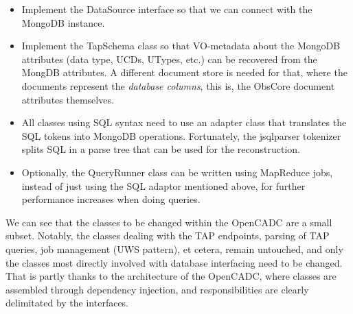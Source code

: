 \begin{itemize}
	
	\item Implement the DataSource interface so that we can connect with the MongoDB instance.
	
	\item Implement the TapSchema class so that VO-metadata about the MongoDB attributes (data type, UCDs, UTypes, etc.) can be recovered from the MongDB attributes. A different document store is needed for that, where the documents represent the \emph{database columns}, this is, the ObsCore document attributes themselves.
	
	\item All classes using SQL syntax need to use an adapter class that translates the SQL tokens into MongoDB operations. Fortunately, the jsqlparser tokenizer splits SQL in a parse tree that can be used for the reconstruction.
	
	\item Optionally, the QueryRunner class can be written using MapReduce jobs, instead of just using the SQL adaptor mentioned above, for further performance increases when doing queries.
	
\end{itemize}

We can see that the classes to be changed within the OpenCADC are a small subset. Notably, the classes dealing with the TAP endpoints, parsing of TAP queries, job management (UWS pattern), et cetera, remain untouched, and only the classes most directly involved with database interfacing need to be changed. That is partly thanks to the architecture of the OpenCADC, where classes are assembled through dependency injection, and responsibilities are clearly delimitated by the interfaces.


